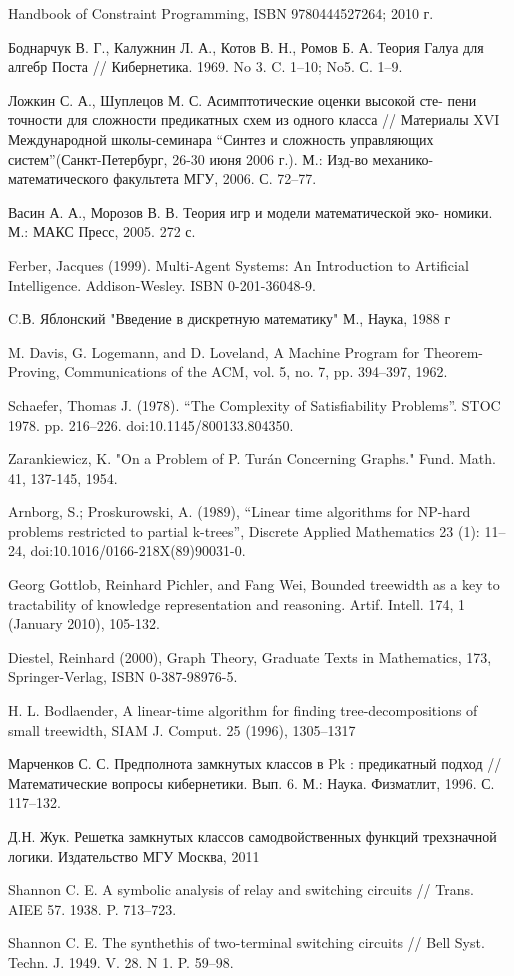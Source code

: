 \documentclass[12pt]{article}
\begin{document}
 Handbook of Constraint Programming, ISBN 9780444527264; 2010 г.

Боднарчук В. Г., Калужнин Л. А., Котов В. Н., Ромов Б. А. Теория
Галуа для алгебр Поста // Кибернетика. 1969. No 3. C. 1–10; No5. С. 1–9.

Ложкин С. А., Шуплецов М. С. Асимптотические оценки высокой сте-
пени точности для сложности предикатных схем из одного класса //
Материалы XVI Международной школы-семинара 
``Синтез и сложность управляющих систем''(Санкт-Петербург, 26-30 июня 2006 г.). М.:
Изд-во механико-математического факультета МГУ, 2006. С. 72–77.


Васин А. А., Морозов В. В. Теория игр и модели математической эко-
номики. М.: МАКС Пресс, 2005. 272 с.

Ferber, Jacques (1999). Multi-Agent Systems: An Introduction to Artificial Intelligence. Addison-Wesley.
ISBN 0-201-36048-9.

C.В. Яблонский "Введение в дискретную математику" М., Наука, 1988 г

M. Davis, G. Logemann, and D. Loveland, A Machine Program for Theorem-Proving,
Communications of the ACM, vol. 5, no. 7, pp. 394–397, 1962.

 Schaefer, Thomas J. (1978). 
``The Complexity of Satisfiability Problems''. STOC 1978. pp. 216–226. doi:10.1145/800133.804350.

 Zarankiewicz, K. "On a Problem of P. Turán Concerning Graphs." Fund. Math. 41, 137-145, 1954. 

 Arnborg, S.; Proskurowski, A. (1989), 
``Linear time algorithms for NP-hard problems restricted to partial k-trees'',
Discrete Applied Mathematics 23 (1): 11–24, doi:10.1016/0166-218X(89)90031-0.

Georg Gottlob, Reinhard Pichler, and Fang Wei, 
Bounded treewidth as a key to tractability of knowledge representation and reasoning. 
Artif. Intell. 174, 1 (January 2010), 105-132. 

Diestel, Reinhard (2000), Graph Theory, Graduate Texts in Mathematics, 
173, Springer-Verlag, ISBN 0-387-98976-5.

H. L. Bodlaender, A linear-time algorithm for finding 
tree-decompositions of small
treewidth, SIAM J. Comput. 25 (1996), 1305–1317

Марченков С. С. Предполнота замкнутых классов в Pk : предикатный
подход // Математические вопросы кибернетики. Вып. 6. М.: Наука.
Физматлит, 1996. С. 117–132.

Д.Н. Жук. Решетка замкнутых классов самодвойственных функций трехзначной логики. Издательство МГУ Москва, 2011

Shannon C. E. A symbolic analysis of relay and switching circuits // Trans.
AIEE 57. 1938. P. 713–723.

Shannon C. E. The synthethis of two-terminal switching circuits // Bell
Syst. Techn. J. 1949. V. 28. N 1. P. 59–98.

\endthebibliography
\end{document}
